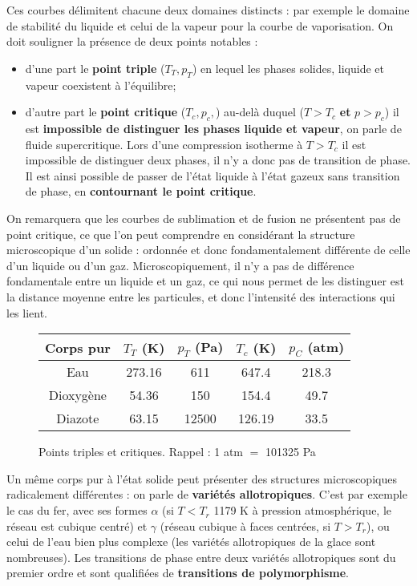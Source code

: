 \documentclass[11pt,a4paper]{report}
\begin{document}
Ces courbes délimitent chacune deux domaines distincts : par exemple le domaine de stabilité du liquide et celui de la vapeur pour la courbe de vaporisation. On doit souligner la présence de deux points notables :
\begin{itemize}
	\item d'une part le \textbf{point triple} ($T_T,p_T$) en lequel les phases solides, liquide et vapeur coexistent à l'équilibre;
	\item d'autre part le \textbf{point critique} ($T_c,p_c,$) au-delà duquel ($T > T_c$ \textbf{et} $p > p_c$) il est \textbf{impossible de distinguer les phases liquide et vapeur}, on parle de fluide supercritique. Lors d'une compression isotherme à $T > T_c$ il est impossible de distinguer deux phases, il n'y a donc pas de transition de phase. Il est ainsi possible de passer de l'état liquide à l'état gazeux sans transition de phase, en \textbf{contournant le point critique}. 
\end{itemize}
 
On remarquera que les courbes de sublimation et de fusion ne présentent pas de point critique, ce que l'on peut comprendre en considérant la structure microscopique d'un solide : ordonnée et donc fondamentalement différente de celle d'un liquide ou d'un gaz. Microscopiquement, il n'y a pas de différence fondamentale entre un liquide et un gaz, ce qui nous permet de les distinguer est la distance moyenne entre les particules, et donc l'intensité des interactions qui les lient.

\begin{figure}
	\begin{center}
		\begin{tabular}{|c|c|c|c|c|}
			\hline
			Corps pur & $T_T$ (K) & $p_T$ (Pa) & $T_c$ (K) & $p_C$ (atm)\\
			\hline
			Eau & 273.16 & 611 & 647.4 & 218.3 \\
			\hline
			Dioxygène & 54.36 & 150 & 154.4 & 49.7\\
			\hline
			Diazote & 63.15 & 12500 & 126.19 & 33.5\\
			\hline
		\end{tabular}
	\end{center}
	\label{tab:tricrit}
	\caption{Points triples et critiques. Rappel : 1 atm $=$ 101325 Pa}
\end{figure} 
 
Un même corps pur à l'état solide peut présenter des structures microscopiques radicalement différentes : on parle de \textbf{variétés allotropiques}. C'est par exemple le cas du fer, avec ses formes $\alpha$ (si $T < T_r$ 1179 K à pression atmosphérique, le réseau est cubique centré) et $\gamma$ (réseau cubique à faces centrées, si $T > T_r$), ou celui de l'eau bien plus complexe (les variétés allotropiques de la glace sont nombreuses). Les transitions de phase entre deux variétés allotropiques sont du premier ordre et sont qualifiées de \textbf{transitions de polymorphisme}.
\end{document}
